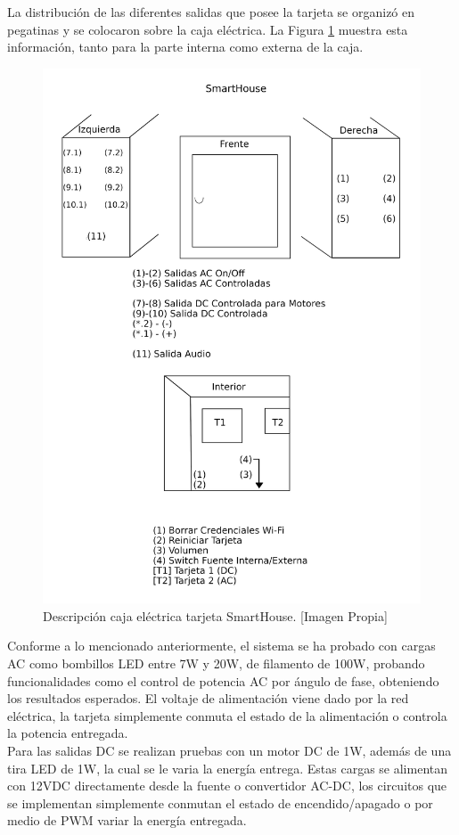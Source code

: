 La distribución de las diferentes salidas que posee la tarjeta se organizó en pegatinas y se colocaron sobre la caja eléctrica. La Figura \ref{fig:labels} muestra esta información, tanto para la parte interna como externa de la caja.\\

\begin{figure}
	\centering
	\caption[Descripción caja eléctrica tarjeta SmartHouse.]{Descripción caja eléctrica tarjeta SmartHouse. [Imagen Propia]}
	\label{fig:labels}
	\includegraphics[width=0.7\linewidth]{Imagenes/labels}
\end{figure}

Conforme a lo mencionado anteriormente, el sistema se ha probado con cargas AC como bombillos LED entre 7W y 20W, de filamento de 100W, probando funcionalidades como el control de potencia AC por ángulo de fase, obteniendo los resultados esperados. El voltaje de alimentación viene dado por la red eléctrica, la tarjeta simplemente conmuta el estado de la alimentación o controla la potencia entregada.\\

Para las salidas DC se realizan pruebas con un motor DC de 1W, además de una tira LED de 1W, la cual se le varia la energía entrega. Estas cargas se alimentan con 12VDC directamente desde la fuente o convertidor AC-DC, los circuitos que se implementan simplemente conmutan el estado de encendido/apagado o por medio de PWM variar la energía entregada.\\

